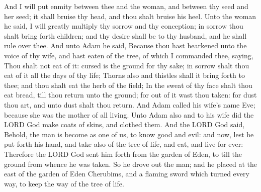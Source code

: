 \begin{biblechapter}
\verse And I will put enmity between thee and the woman, and between thy seed and her seed; it shall bruise thy head, and thou shalt bruise his heel.
\verse Unto the woman he said, I will greatly multiply thy sorrow and thy conception; in sorrow thou shalt bring forth children; and thy desire shall be to thy husband, and he shall rule over thee.
\verse And unto Adam he said, Because thou hast hearkened unto the voice of thy wife, and hast eaten of the tree, of which I commanded thee, saying, Thou shalt not eat of it: cursed is the ground for thy sake; in sorrow shalt thou eat of it all the days of thy life;
\verse Thorns also and thistles shall it bring forth to thee; and thou shalt eat the herb of the field;
\verse In the sweat of thy face shalt thou eat bread, till thou return unto the ground; for out of it wast thou taken: for dust thou art, and unto dust shalt thou return.
\verse And Adam called his wife's name Eve; because she was the mother of all living.
\verse Unto Adam also and to his wife did the LORD God make coats of skins, and clothed them.
\verse And the LORD God said, Behold, the man is become as one of us, to know good and evil: and now, lest he put forth his hand, and take also of the tree of life, and eat, and live for ever:
\verse Therefore the LORD God sent him forth from the garden of Eden, to till the ground from whence he was taken.
\verse So he drove out the man; and he placed at the east of the garden of Eden Cherubims, and a flaming sword which turned every way, to keep the way of the tree of life.
\end{biblechapter}


